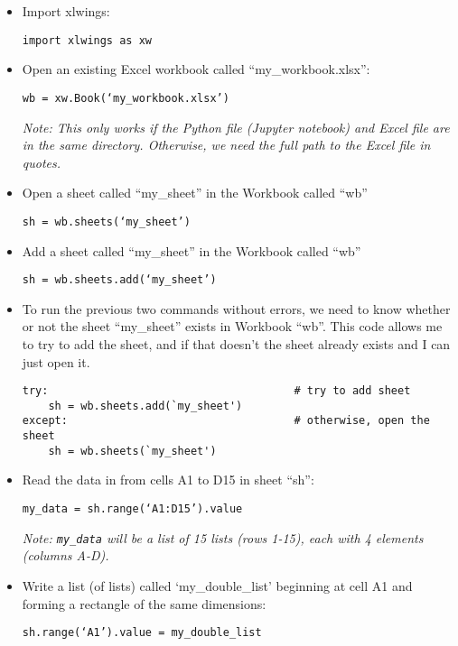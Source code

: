 \documentclass[11pt]{article}
\theoremstyle{definition}
\begin{document}
\begin{itemize}
\item  Import xlwings:  \begin{center} \texttt{import xlwings as xw} \end{center}
\item  Open an existing Excel workbook called ``my\_workbook.xlsx'': \begin{center} \texttt{wb = xw.Book(`my\_workbook.xlsx')} \end{center}
\emph{Note: This only works if the Python file (Jupyter notebook) and Excel file are in the same directory.  Otherwise, we need the full path to the Excel file in quotes.}
\item  Open a sheet called ``my\_sheet'' in the Workbook called ``wb''  \begin{center} \texttt{sh = wb.sheets(`my\_sheet')} \end{center}
\item  Add a sheet called ``my\_sheet'' in the Workbook called ``wb'' \begin{center} \texttt{sh = wb.sheets.add(`my\_sheet')} \end{center}
\item  To run the previous two commands without errors, we need to know whether or not the sheet ``my\_sheet'' exists in Workbook ``wb''.  This code allows me to try to add the sheet, and if that doesn't the sheet already exists and I can just open it.
\begin{center}
\begin{verbatim}
try:                                      # try to add sheet
    sh = wb.sheets.add(`my_sheet')   
except:                                   # otherwise, open the sheet
    sh = wb.sheets(`my_sheet')     
\end{verbatim}
\end{center}

\newpage
\item  Read the data in from cells A1 to D15 in sheet ``sh'':  \begin{center} \texttt{my\_data = sh.range(`A1:D15').value} \end{center}
\emph{Note: \texttt{my\_data} will be a list of 15 lists (rows 1-15), each with 4 elements (columns A-D).}

\item Write a list (of lists) called `my\_double\_list' beginning at cell A1 and forming a rectangle of the same dimensions:
\begin{center} \texttt{sh.range(`A1').value = my\_double\_list} \end{center}  
\end{itemize}
\end{document}
